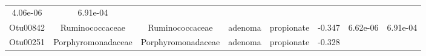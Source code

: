 \documentclass[11pt,]{article}
\begin{document}
\begin{longtable}[]{@{}cccccccc@{}}
\begin{minipage}[t]{0.08\columnwidth}
4.06e-06\strut
\end{minipage} & \begin{minipage}[t]{0.08\columnwidth}\centering\strut
6.91e-04\strut
\end{minipage}\tabularnewline
\begin{minipage}[t]{0.08\columnwidth}\centering\strut
Otu00842\strut
\end{minipage} & \begin{minipage}[t]{0.15\columnwidth}\centering\strut
Ruminococcaceae\strut
\end{minipage} & \begin{minipage}[t]{0.15\columnwidth}\centering\strut
Ruminococcaceae\strut
\end{minipage} & \begin{minipage}[t]{0.08\columnwidth}\centering\strut
adenoma\strut
\end{minipage} & \begin{minipage}[t]{0.09\columnwidth}\centering\strut
propionate\strut
\end{minipage} & \begin{minipage}[t]{0.07\columnwidth}\centering\strut
-0.347\strut
\end{minipage} & \begin{minipage}[t]{0.08\columnwidth}\centering\strut
6.62e-06\strut
\end{minipage} & \begin{minipage}[t]{0.08\columnwidth}\centering\strut
6.91e-04\strut
\end{minipage}\tabularnewline
\begin{minipage}[t]{0.08\columnwidth}\centering\strut
Otu00251\strut
\end{minipage} & \begin{minipage}[t]{0.15\columnwidth}\centering\strut
Porphyromonadaceae\strut
\end{minipage} & \begin{minipage}[t]{0.15\columnwidth}\centering\strut
Porphyromonadaceae\strut
\end{minipage} & \begin{minipage}[t]{0.08\columnwidth}\centering\strut
adenoma\strut
\end{minipage} & \begin{minipage}[t]{0.09\columnwidth}\centering\strut
propionate\strut
\end{minipage} & \begin{minipage}[t]{0.07\columnwidth}\centering\strut
-0.328\strut
\end{minipage} & \begin{minipage}[t]{0.08\columnwidth}\centering\strut

\end{minipage}
\end{longtable}
\end{document}
